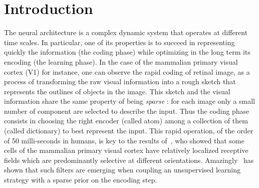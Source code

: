 \documentclass[a4paper, 11pt, draft]{article} %
\title{\Title}
\author{%
\FirstNameA\ \AuthorA \and \FirstNameB\ \AuthorB \and \FirstNameC\ \AuthorC
}
\date{\Institute\ \\
\Organism\
}
\newcommand{\Abstract}{
The formation of structure in the brain, that is, of the connection between cells within neural populations, is by large an unsupervised learning process: The emergence of this architecture is mostly self-organized. In the primary visual cortex of mammals, for example, one may observe during development the emergence of cells selective to localized, oriented features. This leads to the development of a rough representation of contours of the retinal image in area V1.
We modeled these representations using sparse unsupervised learning algorithms.
These algorithms alternate a coding phase to encode the information with a learning phase to find the proper encoder. A major difficulty faced by these types of algorithms is to deduce good representation while  knowing immature encoders, and to learn good encoders with a non-optimal representation
To address this problem, we propose here to introduce a new regulation process between learning and coding, called homeostasis. Our homeostasis is compatible with a neuro-mimetic architecture and allows for the fast emergence of localized filters sensitive to orientation.
The key to this algorithm lies in a simple adaptation mechanism based on non-linear functions that reconciles the antagonistic processes that occur at the coding and learning time scales.
We tested this unsupervised algorithm with this homeostasis rule for a range of existing unsupervised learning algorithms coupled with different neural coding algorithms. In addition, we propose a simplification of this optimal homeostasis rule by implementing a simple heuristic on the probability of activation of neurons. Compared to the optimal homeostasis rule, we show that this heuristic allows to implement an even faster unsupervised learning algorithm while keeping a large part of its effectiveness. These results demonstrate the potential application of such a strategy to the fast classification of images, for example in hierarchical and dynamic architectures.
}
\begin{document}
%
\maketitle
\begin{abstract}
\Abstract
\end{abstract}
\thispagestyle{empty}
\section{Introduction}\label{introduction}
The neural architecture is a complex dynamic system that operates at different time scales. In particular, one of its properties is to succeed in representing quickly the information (the coding phase) while optimizing in the long term its encoding (the learning phase).
 In the case of the mammalian primary visual cortex (V1) for instance, one can observe the rapid coding of retinal image, as a process of transforming the raw visual information into a rough sketch that represents the outlines of objects in the image.
This sketch and the visual information share the same property of being \emph{sparse} : for each image only a small number of component are selected to describe the input. Thus the coding phase consists in choosing the right encoder (called atom) among a collection of them (called dictionary) to  best represent the input.
This rapid operation, of the order of 50 milli-seconds in humans, is key to the results of~\citet{Hubel68}, who showed that some cells of the mammalian primary visual cortex have relatively localized receptive fields which are predominantly selective at different orientations.
Amazingly~\citet{Olshausen96} has shown that such filters are emerging when coupling an unsupervised learning strategy with a sparse prior on the encoding step.
\end{document}
